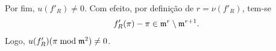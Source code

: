 Por fim, $u(f'_R)\ne0$. Com efeito, por definição de $r=\nu(f'_R)$, tem-se
\[
f'_R(\pi)-\pi\in\mathfrak m^r\setminus\mathfrak m^{r+1}.
\]
Logo, $u(f'_R)(\pi\bmod\mathfrak m^2)\ne0$.
